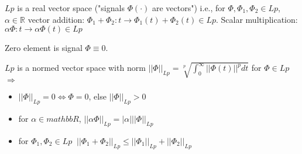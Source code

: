 $Lp$ is a real vector space ("signals $\Phi(\cdot)$ are vectors") i.e., for 
$\Phi, \Phi_1, \Phi_2 \in Lp$, $\alpha \in \mathbb{R}$ vector addition:
$\Phi_1+\Phi_2:t \rightarrow \Phi_1(t)+\Phi_2(t) \in Lp$. Scalar multiplication:
$\alpha \Phi:t\rightarrow \alpha\Phi(t) \in Lp$

Zero element is signal $\Phi \equiv 0$.

$Lp$ is a normed vector space with norm $||\Phi||_{Lp}=\sqrt[p]{\int_0^\infty ||\Phi(t)||^p dt}$
for $\Phi \in Lp$ $\Rightarrow$
\begin{itemize}
 \item $||\Phi||_{Lp}=0 \iff \Phi=0$, else $||\Phi||_{Lp}>0$
 \item for $\alpha \in mathbb{R}$, $||\alpha\Phi||_{Lp}=|\alpha| ||\Phi||_{Lp}$
 \item for $\Phi_1, \Phi_2 \in Lp\ $ $||\Phi_1+\Phi_2||_{Lp} \le ||\Phi_1||_{Lp}+||\Phi_2||_{Lp}$
\end{itemize}
